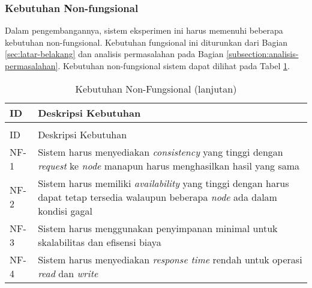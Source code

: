 \subsubsection{Kebutuhan Non-fungsional}
\label{subsubsection:non-functional-requirements}

Dalam pengembangannya, sistem eksperimen ini harus memenuhi beberapa kebutuhan non-fungsional. Kebutuhan fungsional ini diturunkan dari Bagian \ref{sec:latar-belakang} dan analisis permasalahan pada Bagian \ref{subsection:analisis-permasalahan}. Kebutuhan non-fungsional sistem dapat dilihat pada Tabel \ref{tab:non-functional-requirements}.

\begin{longtable}{|l|p{13cm}|}
\caption{Kebutuhan Non-Fungsional}
\label{tab:non-functional-requirements} \\
\hline
\rowcolor{black!10} ID & Deskripsi Kebutuhan \\ \hline
\endfirsthead

\caption[]{Kebutuhan Non-Fungsional (lanjutan)} \\
\hline
\rowcolor{black!10} ID & Deskripsi Kebutuhan \\ \hline
\endhead

NF-1 & Sistem harus menyediakan \textit{consistency} yang tinggi dengan \textit{request} ke \textit{node} manapun harus menghasilkan hasil yang sama \\ \hline
NF-2 & Sistem harus memiliki \textit{availability} yang tinggi dengan harus dapat tetap tersedia walaupun beberapa \textit{node} ada dalam kondisi gagal \\ \hline
NF-3 & Sistem harus menggunakan penyimpanan minimal untuk skalabilitas dan efisensi biaya \\ \hline
NF-4 & Sistem harus menyediakan \textit{response time} rendah untuk operasi \textit{read} dan \textit{write} \\ \hline
\end{longtable}